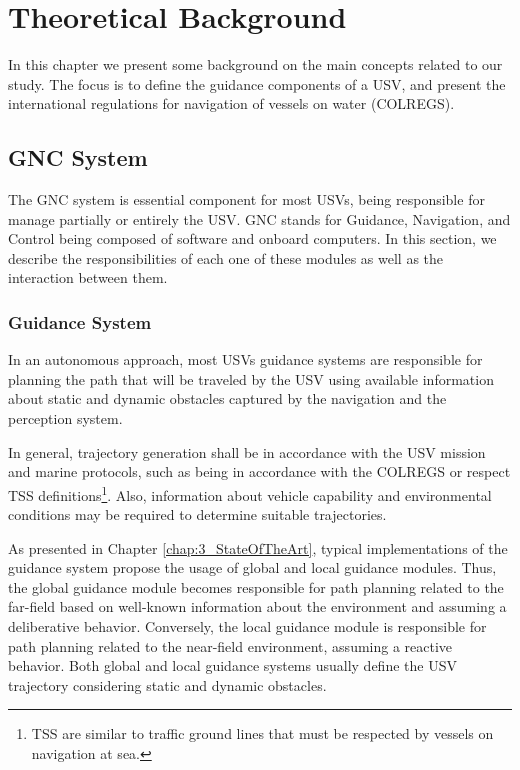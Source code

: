 \chapter{Theoretical Background \label{chap:2_TheoreticalBackground}}


    In this chapter we present some background on the main concepts related to our study. The focus is to define the guidance components of a \ac{USV}, and present the international regulations for navigation of vessels on water (\acs{COLREGS}).

\section{GNC System}
    
    The \acs{GNC} system is essential component for most \acp{USV}, being responsible for manage partially or entirely the \ac{USV}. GNC stands for Guidance, Navigation, and Control being composed of software and onboard computers. In this section, we describe the responsibilities of each one of these modules as well as the interaction between them.
    
    \subsection{Guidance System}

    In an autonomous approach, most \acp{USV} guidance systems are responsible for planning the path that will be traveled by the \ac{USV} using available information about static and dynamic obstacles captured by the navigation and the perception system.

    In general, trajectory generation shall be in accordance with the \ac{USV} mission and marine protocols, such as being in accordance with the \ac{COLREGS} or respect \ac{TSS} definitions\footnote{\ac{TSS} are similar to traffic ground lines that must be respected by vessels on navigation at sea.}. Also, information about vehicle capability and environmental conditions may be required to determine suitable trajectories.
    
    As presented in Chapter \ref{chap:3_StateOfTheArt}, typical implementations of the guidance system propose the usage of global and local guidance modules. Thus, the global guidance module becomes responsible for path planning related to the far-field based on well-known information about the environment and assuming a deliberative behavior. Conversely, the local guidance module is responsible for path planning related to the near-field environment, assuming a reactive behavior. Both global and local guidance systems usually define the \ac{USV} trajectory considering static and dynamic obstacles.
    
